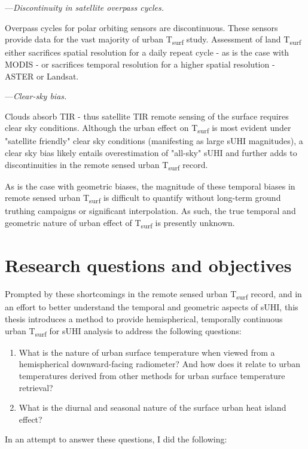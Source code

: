 \begin{bibunit}
\noindent---\textit{Discontinuity in satellite overpass cycles.}

Overpass cycles for polar orbiting sensors are discontinuous. These sensors provide data for the vast majority of urban T\textsubscript{surf} study. Assessment of land T\textsubscript{surf} either sacrifices spatial resolution for a daily repeat cycle - as is the case with MODIS  - or sacrifices temporal resolution for a higher spatial resolution - ASTER or Landsat. 

\noindent---\textit{Clear-sky bias.}

Clouds absorb TIR - thus satellite TIR remote sensing of the surface requires clear sky conditions. Although the urban effect on T\textsubscript{surf} is most evident under "satellite friendly" clear sky conditions (manifesting as large sUHI magnitudes), a clear sky bias likely entails overestimation of "all-sky" sUHI and further adds to discontinuities in the remote sensed urban T\textsubscript{surf} record.

As is the case with geometric biases, the magnitude of these temporal biases in remote sensed urban T\textsubscript{surf} is difficult to quantify without long-term ground truthing campaigns or significant interpolation. As such, the true temporal and geometric nature of urban effect of T\textsubscript{surf} is presently unknown.
 
\section{Research questions and objectives}

Prompted by these shortcomings in the remote sensed urban T\textsubscript{surf} record, and in an effort to better understand the temporal and geometric aspects of sUHI, this thesis introduces a method to provide hemispherical, temporally continuous urban T\textsubscript{surf} for sUHI analysis to address the following questions:

\begin{enumerate}
	\item What is the nature of urban surface temperature when viewed from a hemispherical downward-facing radiometer? And how does it relate to urban temperatures derived from other methods for urban surface temperature retrieval?
	\item What is the diurnal and seasonal nature of the surface urban heat island effect?
\end{enumerate}

\noindent In an attempt to answer these questions, I did the following:


\end{bibunit}
